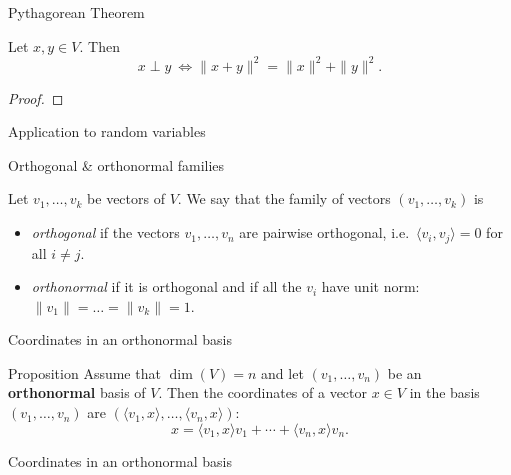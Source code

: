 \documentclass{beamer}
\begin{document}
\begin{frame}{Pythagorean Theorem}
	\grid

	\vspace{-0.4cm}
	\begin{theorem}
		Let $x,y \in V$. Then
		$$
		x \perp y \ \Longleftrightarrow \|x+y\|^2 = \|x\|^2 + \|y\|^2.
		$$
	\end{theorem}
	\begin{proof}
		\vfill
		\vspace{4cm}
	\end{proof}
\end{frame}

\begin{frame}[t]{Application to random variables}
	\grid

\end{frame}

\begin{frame}[t]{Orthogonal \& orthonormal families}
	\grid

	\vspace{-0.4cm}
	\begin{definition}
		Let $v_1, \dots, v_k$ be vectors of $V$. We say that the family of vectors $(v_1, \dots, v_k)$ is
		\begin{itemize}
			\item \emph{orthogonal} if the vectors $v_1, \dots, v_n$ are pairwise orthogonal, i.e.\ $\langle v_i, v_j \rangle = 0$ for all $i \neq j$.
			\item \emph{orthonormal} if it is orthogonal and if all the $v_i$ have unit norm: $\|v_1\| = \dots = \|v_k\| = 1$.
		\end{itemize}
	\end{definition}
\end{frame}

\begin{frame}[t]{Coordinates in an orthonormal basis}
	\grid

	\vspace{-0.4cm}
	\begin{block}{Proposition}
		Assume that $\dim(V)=n$ and let $(v_1, \dots, v_n)$ be an \textbf{orthonormal} basis of $V$. Then the coordinates of a vector $x \in V$ in the basis $(v_1, \dots, v_n)$ are $(\langle v_1, x\rangle, \dots, \langle v_n,x \rangle)$:
		$$
		x = \langle v_1, x \rangle v_1 + \cdots + \langle v_n, x \rangle v_n.
		$$
	\end{block}

\end{frame}
\begin{frame}[t]{Coordinates in an orthonormal basis}
	\grid

\end{frame}
\end{document}
